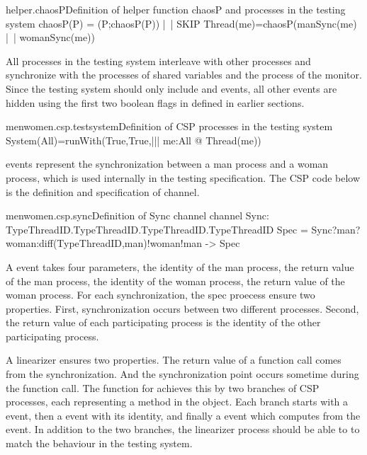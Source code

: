 \documentclass[a4paper, 12pt]{article}
\begin{document}
\begin{cspinline}{helper.chaosP}{Definition of helper function chaosP and processes in the testing system}
chaosP(P) = (P;chaosP(P)) |~| SKIP
Thread(me)=chaosP(manSync(me) |~| womanSync(me))
\end{cspinline}
  
All processes in the testing system interleave with other processes and synchronize with the processes of shared variables and the process of the monitor. Since the testing system should only include  and  events, all other events are hidden using the first two boolean flags in  defined in earlier sections. 

\begin{cspinline}{menwomen.csp.testsystem}{Definition of CSP processes in the testing system}
System(All)=runWith(True,True,||| me:All @ Thread(me))
\end{cspinline}

 events represent the synchronization between a man process and a woman process, which is used internally in the testing specification. The CSP code below is the definition and specification of  channel. 

\begin{cspinline}{menwomen.csp.sync}{Definition of Sync channel}
  channel Sync: TypeThreadID.TypeThreadID.TypeThreadID.TypeThreadID
  Spec = Sync?man?woman:diff(TypeThreadID,{man})!woman!man -> Spec
\end{cspinline}
  
A  event takes four parameters, the identity of the man process, the return value of the man process, the identity of the woman process, the return value of the woman process. For each synchronization, the spec proecess ensure two properties. First, synchronization occurs between two different processes. Second, the return value of each participating process is the identity of the other participating process. 


A linearizer ensures two properties. The return value of a function call comes from the synchronization. And the synchronization point occurs sometime during the function call. The  function for  achieves this by two branches of CSP processes, each representing a method in the object. Each branch starts with a  event, then a  event with its identity, and finally a  event which computes from the  event. In addition to the two branches, the linearizer process should be able to  to match the behaviour in the testing system.
\end{document}
